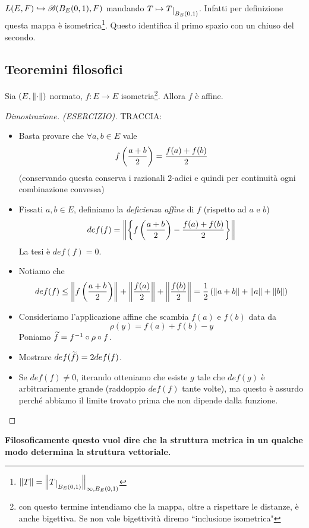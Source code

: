 \begin{remark}
$L(E,F)\hookrightarrow \mathscr{B}(B_E(0,1),F)$ mandando $T\mapsto T\res{B_E(0,1)}$. Infatti per definizione questa mappa \`e isometrica\footnote{$\norm T=\norm{T\res{B_E(0,1)}}_{\infty,B_E(0,1)}$}. Questo identifica il primo spazio con un chiuso del secondo.
\end{remark}


\subsection{Teoremini filosofici}
\begin{theorem}\label{ThBanachMazur}
Sia $(E,\left\Vert{\cdot}\right\Vert)$ normato, $f:E\to E$ isometria\footnote{con questo termine intendiamo che la mappa, oltre a rispettare le distanze, \`e anche bigettiva. Se non vale bigettivit\`a diremo ``inclusione isometrica"}. Allora $f$ \`e affine.
\end{theorem}
\begin{proof}[Dimostrazione. (ESERCIZIO)]
TRACCIA:
\begin{itemize}
    \item Basta provare che $\forall a,b\in E$ vale
    \[f\left({\frac{a+b}2}\right)=\frac{f(a)+f(b)}2\]
    (conservando questa conserva i razionali $2$-adici e quindi per continuit\`a ogni combinazione convessa)
    \item Fissati $a,b\in E$, definiamo la \emph{deficienza affine} di $f$ (rispetto ad $a$ e $b$)
    \[def(f)=\left\Vert{\left\{{f\left({\frac{a+b}2}\right)-\frac{f(a)+f(b)}2}\right\}}\right\Vert\]
    La tesi \`e $def(f)=0$.
    \item Notiamo che 
    \[def(f)\leq \left\Vert{f\left({\frac{a+b}2}\right)}\right\Vert+\left\Vert{\frac{f(a)}2}\right\Vert+\left\Vert{\frac{f(b)}2}\right\Vert=\frac12\left({\left\Vert{a+b}\right\Vert+\left\Vert{a}\right\Vert+\left\Vert{b}\right\Vert}\right)\]
    \item Consideriamo l'applicazione affine che scambia $f(a)$ e $f(b)$ data da
    \[\rho(y)=f(a)+f(b)-y\]
    Poniamo $\widetilde{f}=f^{-1}\circ \rho\circ f$.
    \item Mostrare $def(\widetilde{f})=2def(f)$.
    \item Se $def(f)\neq 0$, iterando otteniamo che esiste $g$ tale che $def(g)$ \`e arbitrariamente grande (raddoppio $def(f)$ tante volte), ma questo \`e assurdo perch\'e abbiamo il limite trovato prima che non dipende dalla funzione.
\end{itemize}
\end{proof}

\begin{center}
\textbf{Filosoficamente questo vuol dire che la struttura metrica in un qualche modo determina la struttura vettoriale.}
\end{center}

